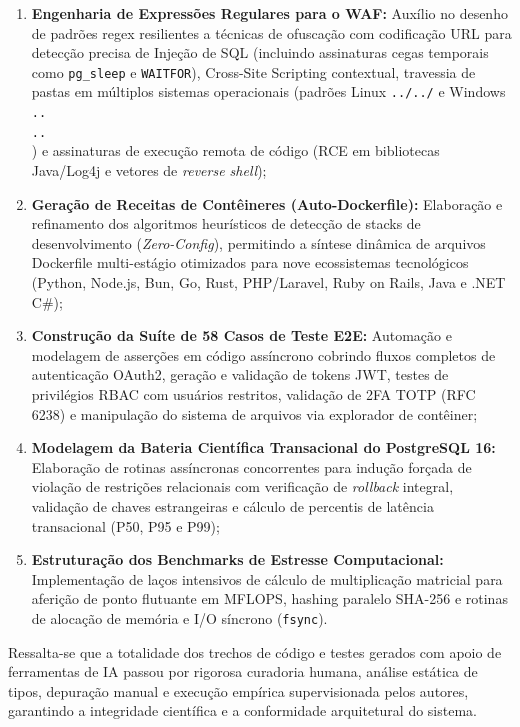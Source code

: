 \begin{enumerate}[label=(\alph*)]
    \item \textbf{Engenharia de Expressões Regulares para o WAF:} Auxílio no desenho de padrões regex resilientes a técnicas de ofuscação com codificação URL para detecção precisa de Injeção de SQL (incluindo assinaturas cegas temporais como \texttt{pg\_sleep} e \texttt{WAITFOR}), Cross-Site Scripting contextual, travessia de pastas em múltiplos sistemas operacionais (padrões Linux \texttt{../../} e Windows \texttt{..\\..\\}) e assinaturas de execução remota de código (RCE em bibliotecas Java/Log4j e vetores de \textit{reverse shell});
    \item \textbf{Geração de Receitas de Contêineres (Auto-Dockerfile):} Elaboração e refinamento dos algoritmos heurísticos de detecção de stacks de desenvolvimento (\textit{Zero-Config}), permitindo a síntese dinâmica de arquivos Dockerfile multi-estágio otimizados para nove ecossistemas tecnológicos (Python, Node.js, Bun, Go, Rust, PHP/Laravel, Ruby on Rails, Java e .NET C\#);
    \item \textbf{Construção da Suíte de 58 Casos de Teste E2E:} Automação e modelagem de asserções em código assíncrono cobrindo fluxos completos de autenticação OAuth2, geração e validação de tokens JWT, testes de privilégios RBAC com usuários restritos, validação de 2FA TOTP (RFC 6238) e manipulação do sistema de arquivos via explorador de contêiner;
    \item \textbf{Modelagem da Bateria Científica Transacional do PostgreSQL 16:} Elaboração de rotinas assíncronas concorrentes para indução forçada de violação de restrições relacionais com verificação de \textit{rollback} integral, validação de chaves estrangeiras e cálculo de percentis de latência transacional (P50, P95 e P99);
    \item \textbf{Estruturação dos Benchmarks de Estresse Computacional:} Implementação de laços intensivos de cálculo de multiplicação matricial para aferição de ponto flutuante em MFLOPS, hashing paralelo SHA-256 e rotinas de alocação de memória e I/O síncrono (\texttt{fsync}).
\end{enumerate}

Ressalta-se que a totalidade dos trechos de código e testes gerados com apoio de ferramentas de IA passou por rigorosa curadoria humana, análise estática de tipos, depuração manual e execução empírica supervisionada pelos autores, garantindo a integridade científica e a conformidade arquitetural do sistema.


